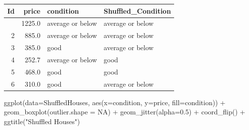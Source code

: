 \documentclass[
  letterpaper,
  DIV=11,
  numbers=noendperiod]{scrreprt}
\newenvironment{Shaded}{\begin{snugshade}}{\end{snugshade}}
\newcommand{\AttributeTok}[1]{\textcolor[rgb]{0.40,0.45,0.13}{#1}}
\newcommand{\ConstantTok}[1]{\textcolor[rgb]{0.56,0.35,0.01}{#1}}
\newcommand{\DecValTok}[1]{\textcolor[rgb]{0.68,0.00,0.00}{#1}}
\newcommand{\DocumentationTok}[1]{\textcolor[rgb]{0.37,0.37,0.37}{\textit{#1}}}
\newcommand{\FloatTok}[1]{\textcolor[rgb]{0.68,0.00,0.00}{#1}}
\newcommand{\FunctionTok}[1]{\textcolor[rgb]{0.28,0.35,0.67}{#1}}
\newcommand{\NormalTok}[1]{\textcolor[rgb]{0.00,0.23,0.31}{#1}}
\newcommand{\OtherTok}[1]{\textcolor[rgb]{0.00,0.23,0.31}{#1}}
\newcommand{\SpecialCharTok}[1]{\textcolor[rgb]{0.37,0.37,0.37}{#1}}
\newcommand{\StringTok}[1]{\textcolor[rgb]{0.13,0.47,0.30}{#1}}
\begin{document}
\begin{Shaded}
\end{Shaded}

\begin{Shaded}
\end{Shaded}

\begin{longtable}[]{@{}rrll@{}}
\toprule\noalign{}
Id & price & condition & Shuffled\_Condition \\
\midrule\noalign{}
\endhead
\bottomrule\noalign{}
\endlastfoot
1 & 1225.0 & average or below & average or below \\
2 & 885.0 & average or below & average or below \\
3 & 385.0 & good & average or below \\
4 & 252.7 & average or below & good \\
5 & 468.0 & good & good \\
6 & 310.0 & good & average or below \\
\end{longtable}

\begin{Shaded}
\begin{Highlighting}[]
\FunctionTok{ggplot}\NormalTok{(}\AttributeTok{data=}\NormalTok{ShuffledHouses, }\FunctionTok{aes}\NormalTok{(}\AttributeTok{x=}\NormalTok{condition, }\AttributeTok{y=}\NormalTok{price, }\AttributeTok{fill=}\NormalTok{condition)) }\SpecialCharTok{+} 
  \FunctionTok{geom\_boxplot}\NormalTok{(}\AttributeTok{outlier.shape =} \ConstantTok{NA}\NormalTok{) }\SpecialCharTok{+} \FunctionTok{geom\_jitter}\NormalTok{(}\AttributeTok{alpha=}\FloatTok{0.5}\NormalTok{) }\SpecialCharTok{+} \FunctionTok{coord\_flip}\NormalTok{() }\SpecialCharTok{+} \FunctionTok{ggtitle}\NormalTok{(}\StringTok{"Shuffled Houses"}\NormalTok{)}
\end{Highlighting}
\end{Shaded}
\end{document}
